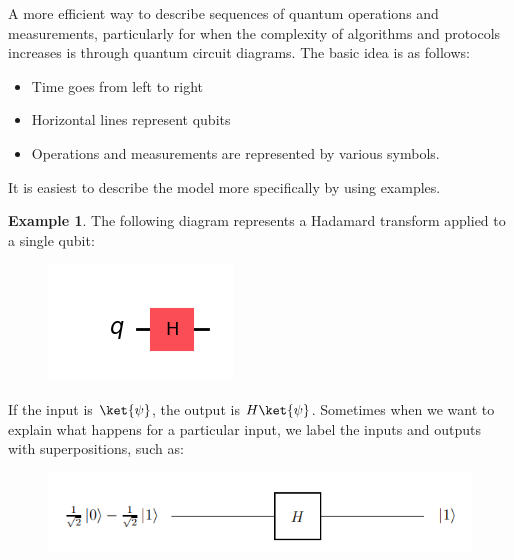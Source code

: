 \documentclass[12pt, oneside]{book}
\theoremstyle{definition}
\theoremstyle{definition}
\newtheorem{example}{Example}[section]
\theoremstyle{remark}
\begin{document}
A more efficient way to describe sequences of quantum operations and measurements, particularly for when the complexity of algorithms and protocols increases is through quantum circuit diagrams. The basic idea is as follows:
\begin{itemize}
    \item Time goes from left to right
    \item Horizontal lines represent qubits
    \item Operations and measurements are represented by various symbols.
\end{itemize}
It is easiest to describe the model more specifically by using examples.
\begin{example}
    The following diagram represents a Hadamard transform applied to a single qubit:
    \begin{figure}[H]
        \centering
        \includegraphics[width=0.25\linewidth]{../images/hadamard.png}
    \end{figure}
    If the input is $\ket{\psi}$, the output is $H\ket{\psi}$. Sometimes when we want to explain what happens for a particular input, we label the inputs and outputs with superpositions, such as:
    \begin{figure}[H]
    \centering
    \includegraphics[width=0.65\linewidth]{../images/circ_exe.png}
\end{figure}
\end{example}
\end{document}
